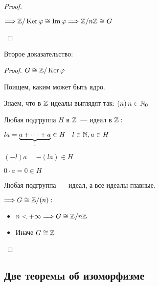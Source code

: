 \begin{theorem}
\begin{proof}
\begin{enumerate}
            $\Longrightarrow \mathbb{Z} / \operatorname{Ker} \varphi \cong \operatorname{Im} \varphi \Longrightarrow \mathbb{Z} / n \mathbb{Z} \cong G$
             
        \end{enumerate}
    \end{proof}

    Второе доказательство:
    \begin{proof}
        
        $G \cong \mathbb{Z} / \operatorname{Ker} \varphi$

        Поищем, каким может быть ядро.

        Знаем, что в $\mathbb{Z}$ идеалы выглядят так: $(n) \, n \in \mathbb{N}_{0}$

        Любая подгруппа $H$ в $\mathbb{Z}$~--- идеал в $\mathbb{Z}:$

        $la = \underbrace{a + \dots + a}_{\text{l}} \in H \quad l \in \mathbb{N}, a \in H$

        $(-l)a = -(la) \in H$

        $0 \cdot a = 0 \in H$

        Любая подгруппа~--- идеал, а все идеалы главные.

        $\Longrightarrow G \cong \mathbb{Z} / (n):$
        \begin{itemize}
            \item $n < +\infty \Longrightarrow G \cong \mathbb{Z} / n \mathbb{Z}$
            \item Иначе $G \cong \mathbb{Z}$
        \end{itemize}
    \end{proof}
\end{theorem}

\subsection{Две теоремы об изоморфизме}

